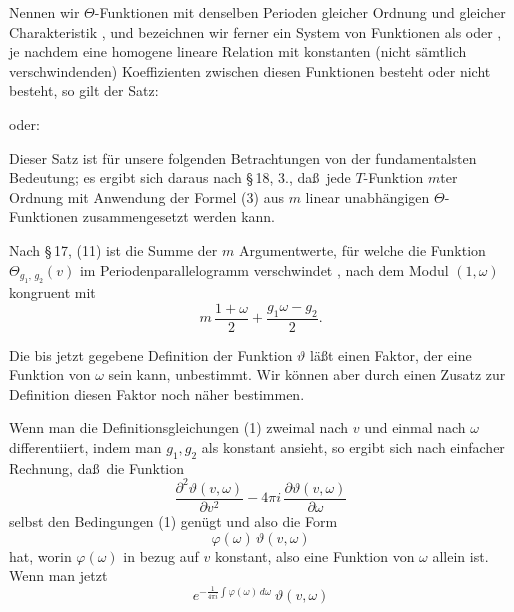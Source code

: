 
Nennen wir $\Theta$-Funktionen mit denselben Perioden gleicher
Ordnung und gleicher Charakteristik , und bezeichnen
wir ferner ein System von Funktionen als 
oder , je nachdem eine homogene lineare Relation
mit konstanten (nicht s\"amtlich verschwindenden) Koeffizienten
zwischen diesen Funktionen besteht oder nicht besteht, so gilt
der Satz:


oder:


Dieser Satz ist f\"ur unsere folgenden Betrachtungen von der
fundamentalsten Bedeutung; es ergibt sich daraus nach \S\,18, 3.,
da\ss\ jede $T$-Funktion $m$ter Ordnung mit Anwendung der Formel (3)
aus $m$ linear unabh\"angigen $\Theta$-Funktionen zusammengesetzt
werden kann.

Nach \S\,17, (11) ist die Summe der $m$ Argumentwerte, f\"ur
welche die Funktion $\Theta_{g_1,\, g_2}(v)$ im Periodenparallelogramm verschwindet
, nach dem Modul $(1, \omega)$ kongruent mit
\[
m\,\frac{1+\omega}{2} + \frac{g_1\omega - g_2}{2}.
\]

Die bis jetzt gegebene Definition der Funktion $\vartheta$ l\"a\ss t einen
Faktor, der eine Funktion von $\omega$ sein kann, unbestimmt. Wir
k\"onnen aber durch einen Zusatz zur Definition diesen Faktor
noch n\"aher bestimmen.

Wenn man die Definitionsgleichungen (1) zweimal nach $v$
und einmal nach $\omega$ differentiiert, indem man $g_1, g_2$ als konstant
ansieht, so ergibt sich nach einfacher Rechnung, da\ss\ die Funktion
\[
\frac{\partial^2 \vartheta(v,\omega)}{\partial v^2} - 4\pi i\,\frac{\partial \vartheta(v,\omega)}{\partial \omega}
\]
selbst den Bedingungen (1) gen\"ugt und also die Form
\[
\varphi(\omega)\,\vartheta(v,\omega)
\]
hat, worin $\varphi(\omega)$ in bezug auf $v$ konstant, also eine Funktion von $\omega$
allein ist. Wenn man jetzt
\[
e^{-\frac{1}{4\pi i}\int \varphi(\omega)\,d\omega}\ \vartheta(v,\omega)
\]
